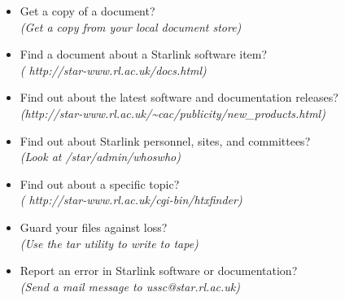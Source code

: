 \begin{itemize}
\hspace*{10mm} {\em (Ask your Site Manager, or look in your Local Guide)}
\item Get a copy of a document?\\
\hspace*{10mm} {\em (Get a copy from your local document store)}
\item Find a document about a Starlink software item?\\
\hspace*{10mm} {\em (
{http://star-www.rl.ac.uk/docs.html})}
\item Find out about the latest software and documentation releases?\\
\hspace*{10mm}
{\em (http://star-www.rl.ac.uk/\~{}cac/publicity/new\_products.html)}
\item Find out about Starlink personnel, sites, and committees?\\
\hspace*{10mm} {\em (Look at /star/\-admin/\-whoswho)}
\item Find out about a specific topic?\\
\hspace*{10mm} {\em (
{http://star-www.rl.ac.uk/cgi-bin/htxfinder})}
\item Guard your files against loss?\\
\hspace*{10mm} {\em (Use the tar utility to write to tape)}
\item Report an error in Starlink software or documentation?\\
\hspace*{10mm} {\em (Send a mail message to ussc@star.rl.ac.uk)}
\end{itemize}

